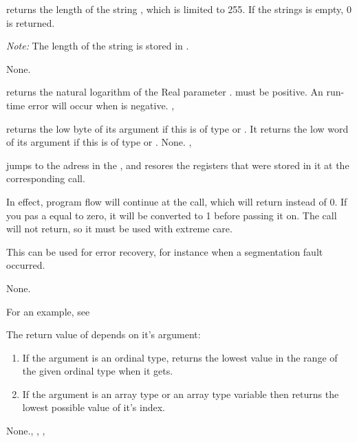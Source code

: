 \documentclass{report}
\begin{document}
\html{}

{ returns the length of the string ,
which is limited to 255. If the strings  is empty, 0 is returned.

{\em Note:} The length of the string  is stored in .
}
{None.}
{}

\html{}

{
 returns the natural logarithm of the Real parameter .
 must be positive.
}
{An run-time error will occur when  is negative.}
{, }

\html{}

{ returns the low byte of its argument if this is of type
 or
. It returns the low word of its argument if this is of type 
 or .}
{None.}
{, }

\html{}

{
 jumps to the adress in the  ,
and resores the registers that were stored in it at the corresponding
 call.

In effect, program flow will continue at the  call, which will
return  instead of 0. If you pas a  equal to zero, it will be
converted to 1 before passing it on. The call will not return, so it must be 
used with extreme care.

This can be used for error recovery, for instance when a segmentation fault
occurred.}{None.}{}

For an example, see 

{ The return value of  depends on it's argument:
\begin{enumerate}
\item If the argument is an ordinal type,  returns the lowest value in the range of the given ordinal 
type when it gets.
\item If the argument is an array type or an array type variable then 
 returns the lowest possible value of it's index.
\end{enumerate}
}{None.}{, , , }
\end{document}
